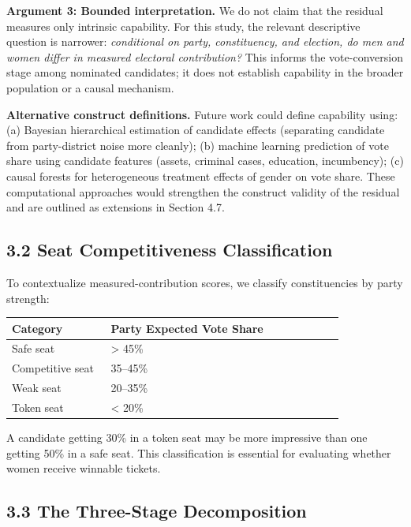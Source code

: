 \documentclass[
]{article}
\newcounter{none} %
\begin{document}
\textbf{Argument 3: Bounded interpretation.} We do not claim that the residual measures only intrinsic capability. For this study, the relevant descriptive question is narrower: \emph{conditional on party, constituency, and election, do men and women differ in measured electoral contribution?} This informs the vote-conversion stage among nominated candidates; it does not establish capability in the broader population or a causal mechanism.

\textbf{Alternative construct definitions.} Future work could define capability using: (a) Bayesian hierarchical estimation of candidate effects (separating candidate from party-district noise more cleanly); (b) machine learning prediction of vote share using candidate features (assets, criminal cases, education, incumbency); (c) causal forests for heterogeneous treatment effects of gender on vote share. These computational approaches would strengthen the construct validity of the residual and are outlined as extensions in Section 4.7.

\subsection{3.2 Seat Competitiveness Classification}\label{32-seat-competitiveness-classification}

To contextualize measured-contribution scores, we classify constituencies by party strength:

{\def\LTcaptype{none} %
\begin{longtable}[]{@{}p{0.28\linewidth}p{0.66\linewidth}@{}}
\toprule\noalign{}
Category & Party Expected Vote Share \\
\midrule\noalign{}
\endhead
\bottomrule\noalign{}
\endlastfoot
Safe seat & \textgreater{} 45\% \\
Competitive seat & 35--45\% \\
Weak seat & 20--35\% \\
Token seat & \textless{} 20\% \\
\end{longtable}
}

A candidate getting 30\% in a token seat may be more impressive than one getting 50\% in a safe seat. This classification is essential for evaluating whether women receive winnable tickets.

\subsection{3.3 The Three-Stage Decomposition}\label{33-the-three-stage-decomposition}
\end{document}
